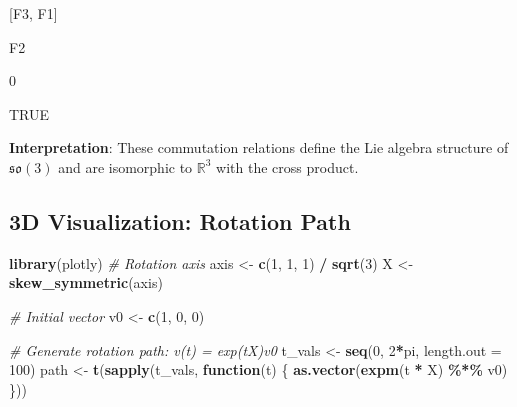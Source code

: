 \documentclass[
]{book}
\newenvironment{Shaded}{\begin{snugshade}}{\end{snugshade}}
\newcommand{\AttributeTok}[1]{\textcolor[rgb]{0.13,0.29,0.53}{#1}}
\newcommand{\CommentTok}[1]{\textcolor[rgb]{0.56,0.35,0.01}{\textit{#1}}}
\newcommand{\ControlFlowTok}[1]{\textcolor[rgb]{0.13,0.29,0.53}{\textbf{#1}}}
\newcommand{\DecValTok}[1]{\textcolor[rgb]{0.00,0.00,0.81}{#1}}
\newcommand{\FunctionTok}[1]{\textcolor[rgb]{0.13,0.29,0.53}{\textbf{#1}}}
\newcommand{\NormalTok}[1]{#1}
\newcommand{\OtherTok}[1]{\textcolor[rgb]{0.56,0.35,0.01}{#1}}
\newcommand{\SpecialCharTok}[1]{\textcolor[rgb]{0.81,0.36,0.00}{\textbf{#1}}}
\theoremstyle{definition}
\theoremstyle{definition}
\theoremstyle{definition}
\theoremstyle{definition}
\theoremstyle{remark}
\begin{document}
{[}F3, F1{]}

F2

0

TRUE

\textbf{Interpretation}: These commutation relations define the Lie algebra structure of \(\mathfrak{so}(3)\) and are isomorphic to \(\mathbb{R}^3\) with the cross product.

\subsection{3D Visualization: Rotation Path}\label{d-visualization-rotation-path}

\begin{Shaded}
\begin{Highlighting}[]
\FunctionTok{library}\NormalTok{(plotly)}
\CommentTok{\# Rotation axis}
\NormalTok{axis }\OtherTok{\textless{}{-}} \FunctionTok{c}\NormalTok{(}\DecValTok{1}\NormalTok{, }\DecValTok{1}\NormalTok{, }\DecValTok{1}\NormalTok{) }\SpecialCharTok{/} \FunctionTok{sqrt}\NormalTok{(}\DecValTok{3}\NormalTok{)}
\NormalTok{X }\OtherTok{\textless{}{-}} \FunctionTok{skew\_symmetric}\NormalTok{(axis)}

\CommentTok{\# Initial vector}
\NormalTok{v0 }\OtherTok{\textless{}{-}} \FunctionTok{c}\NormalTok{(}\DecValTok{1}\NormalTok{, }\DecValTok{0}\NormalTok{, }\DecValTok{0}\NormalTok{)}

\CommentTok{\# Generate rotation path: v(t) = exp(tX)v0}
\NormalTok{t\_vals }\OtherTok{\textless{}{-}} \FunctionTok{seq}\NormalTok{(}\DecValTok{0}\NormalTok{, }\DecValTok{2}\SpecialCharTok{*}\NormalTok{pi, }\AttributeTok{length.out =} \DecValTok{100}\NormalTok{)}
\NormalTok{path }\OtherTok{\textless{}{-}} \FunctionTok{t}\NormalTok{(}\FunctionTok{sapply}\NormalTok{(t\_vals, }\ControlFlowTok{function}\NormalTok{(t) \{}
  \FunctionTok{as.vector}\NormalTok{(}\FunctionTok{expm}\NormalTok{(t }\SpecialCharTok{*}\NormalTok{ X) }\SpecialCharTok{\%*\%}\NormalTok{ v0)}
\NormalTok{\}))}


\end{Highlighting}
\end{Shaded}
\end{document}
